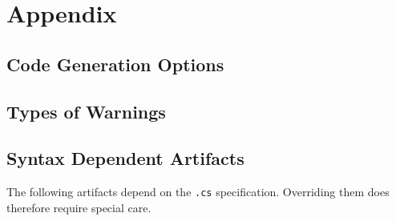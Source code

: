 \documentclass[smallheadings,headsepline,pointlessnumbers,11pt,a4paper]{scrbook}
\begin{document}
\renewcommand{\thesection}{A\arabic{section}}
\setcounter{section}{0}  %
\renewcommand{\thechapter}{A}
\chapter{Appendix}

\begin{appendix}
\section{Code Generation Options}
\label{app:options}


\section{Types of Warnings}
\label{app:warnings}


\section{Syntax Dependent Artifacts}
\label{app:syndep}

The following artifacts depend on the \texttt{.cs} specification. Overriding
them does therefore require special care.


\end{appendix}


\end{document}
